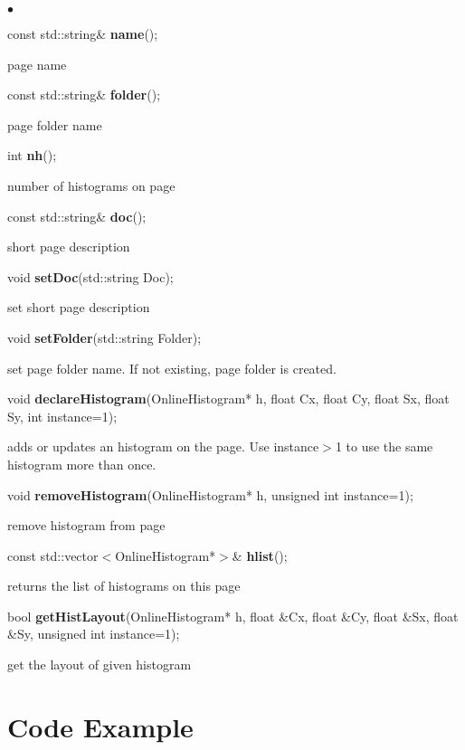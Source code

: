 \documentclass{lhcbnote}
\begin{document}
\begin{list}{$\bullet$}{}
\item   const std::string\& {\bf name}();

page name
\item   const std::string\& {\bf folder}();

page folder name
\item   int {\bf nh}();

number of histograms on page
\item   const std::string\& {\bf doc}();

short page description
\item void {\bf setDoc}(std::string Doc);

set short page description
\item   void {\bf setFolder}(std::string Folder);

set page folder name. If not existing, page folder is created.
\item   void {\bf declareHistogram}(OnlineHistogram* h,
		    float Cx,
		    float Cy,
		    float Sx,
		    float Sy,
		    int instance=1);

adds or updates an histogram on the page. Use instance$>$1 to use the
same histogram more than once. 

\item   void {\bf removeHistogram}(OnlineHistogram* h, unsigned int instance=1);

remove histogram from page
\item   const std::vector$<$OnlineHistogram*$>$\& { \bf hlist}();

returns the list of histograms on this page
\item   bool {\bf getHistLayout}(OnlineHistogram* h,
		     float \&Cx,
		     float \&Cy,
		     float \&Sx,
		     float \&Sy,
		     unsigned int instance=1);

get the layout of given histogram 

\end{list}


\section{Code Example}
\end{document}
